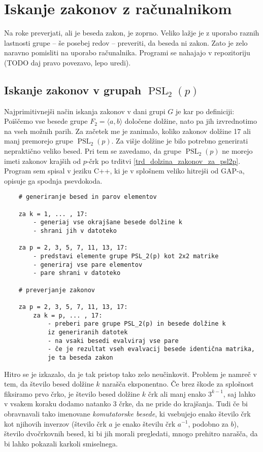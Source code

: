 \section{Iskanje zakonov z računalnikom}
\label{sec_racunalnisko_iskanje}

Na roke preverjati, ali je beseda zakon, je zoprno. Veliko lažje je z uporabo raznih lastnosti grupe -- še posebej redov -- preveriti, da beseda ni zakon. 
Zato je zelo naravno pomisliti na uporabo računalnika. %
Programi se nahajajo v repozitoriju (TODO daj pravo povezavo, lepo uredi).

\subsection{Iskanje zakonov v grupah $\operatorname{PSL}_2(p)$} %

Najprimitivnejši način iskanja zakonov v dani grupi $G$ je kar po definiciji: Poiščemo vse besede grupe $F_2 = \langle a,b \rangle$ določene dolžine, nato pa jih izvrednotimo na vseh možnih parih.
Za začetek me je zanimalo, koliko zakonov dolžine 17 ali manj premorejo grupe $\operatorname{PSL}_2(p)$. Za višje dolžine je bilo potrebno generirati nepraktično veliko besed. Pri tem se zavedamo, da grupe $\operatorname{PSL}_2(p)$ ne morejo imeti zakonov krajših od $p$-črk po trditvi \ref{trd_dolzina_zakonov_za_psl2p}.
Program sem spisal v jeziku C++, ki je v splošnem veliko hitrejši od GAP-a, opisuje ga spodnja psevdokoda.

\begin{verbatim}
    # generiranje besed in parov elementov

    za k = 1, ... , 17:
        - generiaj vse okrajšane besede dolžine k
        - shrani jih v datoteko
    
    za p = 2, 3, 5, 7, 11, 13, 17:
        - predstavi elemente grupe PSL_2(p) kot 2x2 matrike
        - generiraj vse pare elementov
        - pare shrani v datoteko

    # preverjanje zakonov
    
    za p = 2, 3, 5, 7, 11, 13, 17:
        za k = p, ... , 17:
            - preberi pare grupe PSL_2(p) in besede dolžine k 
            iz generiranih datotek
            - na vsaki besedi evalviraj vse pare
            - če je rezultat vseh evalvacij besede identična matrika,
            je ta beseda zakon
\end{verbatim}

Hitro se je izkazalo, da je tak pristop tako zelo neučinkovit. Problem je namreč v tem, da število besed dolžine $k$ narašča eksponentno. Če brez škode za splošnost fiksiramo prvo črko, je število besed dolžine $k$ črk ali manj enako $3^{k - 1}$,
saj lahko v vsakem koraku dodamo natanko 3 črke, da ne pride do krajšanja. Tudi če bi obravnavali tako imenovane \emph{komutatorske besede}, ki vsebujejo enako število črk kot njihovih inverzov (število črk $a$ je enako številu črk $a^{-1}$, podobno za $b$),
število dvočrkovnih besed, ki bi jih morali pregledati, mnogo prehitro narašča, da bi lahko pokazali karkoli smiselnega.

